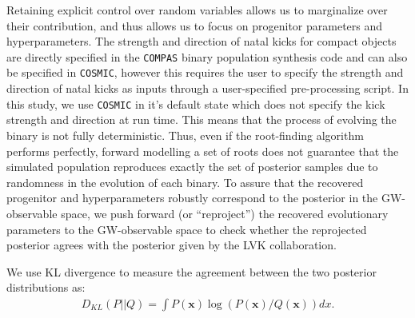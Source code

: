 \documentclass[twocolumn]{aastex631}
\newcommand{\wf}[1]{\textcolor{cyan}{WF: #1}}
\begin{document}
Retaining explicit control over random variables allows us to marginalize over
their contribution, and thus allows us to focus on progenitor parameters and
hyperparameters. The strength and direction of natal kicks for compact objects 
are directly specified in the \texttt{COMPAS} binary population synthesis code 
\citep{Riley2022} and can also be specified in \texttt{COSMIC}, however 
this requires the user to specify the strength and direction of natal kicks as 
inputs through a user-specified pre-processing script.  In this study, we use 
\texttt{COSMIC} in it's default state which does not specify the kick strength 
and direction at run time. %
This means that the process of evolving the binary
is not fully deterministic. Thus, even if the root-finding algorithm performs
perfectly, forward modelling a set of roots does not guarantee that the
simulated population reproduces exactly the set of posterior samples due to
randomness in the evolution of each binary. To assure that the recovered
progenitor and hyperparameters robustly correspond to the posterior in the
GW-observable space, we push forward (or ``reproject'') the recovered
evolutionary parameters to the GW-observable space to check whether the
reprojected posterior agrees with the posterior given by the LVK collaboration.




We use KL divergence to measure the agreement between the two posterior
distributions as:
\begin{align}
D_{KL}(P||Q) = \int P(\bm{x}) \log(P(\bm{x})/Q(\bm{x})) dx.
\label{eq:KLdivergence}
\end{align}
\end{document}
